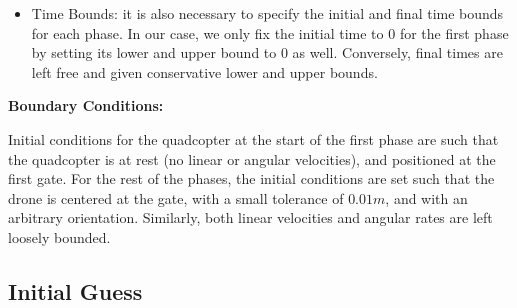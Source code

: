 \begin{itemize}
  \item Time Bounds: it is also necessary to specify the initial and final time bounds for each phase.
  In our case, we only fix the initial time to $0$ for the first phase by setting its lower and upper bound to $0$ as well.
  Conversely, final times are left free and given conservative lower and upper bounds.


\end{itemize}

\textbf{Boundary Conditions:}

Initial conditions for the quadcopter at the start of the first phase are such that the quadcopter is at rest (no linear or angular velocities), and positioned at the first gate.
For the rest of the phases, the initial conditions are set such that the drone is centered at the gate, with a small tolerance of $0.01m$, and with an arbitrary orientation.
Similarly, both linear velocities and angular rates are left loosely bounded.

\subsection{Initial Guess}
